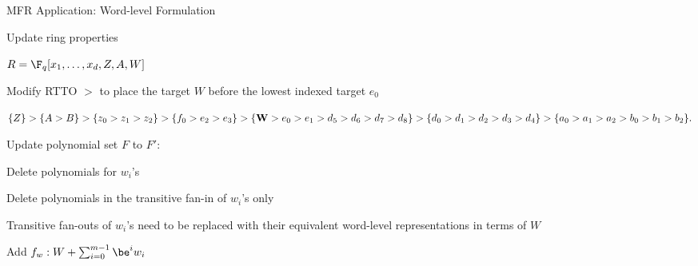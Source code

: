 


\begin{frame}{\large MFR Application: Word-level Formulation}
\bi
	\item Update ring properties 
	\bi
		\item $R=\F_q[x_1,\dots,x_d,Z,A,W]$
		\item Modify RTTO $>$ to place the target $W$ before the lowest indexed target $e_0$
		\bi
			\item $\{Z\}>\{A>B\}>\{z_0>z_1>z_2\}>\{f_0>e_2>e_3\}>\{{\bf{W}}>e_0>e_1>d_5>d_6>d_7>d_8\}>
				\{d_0>d_1>d_2>d_3>d_4\}>\{a_0>a_1>a_2>b_0>b_1>b_2\}.$
		\ei
	\ei
	\vspace{0.1in}
	\item Update polynomial set $F$ to $F'$:
	\bi
		\item Delete polynomials for $w_i$'s
		\item Delete polynomials in the transitive fan-in of $w_i$'s only
		\item Transitive fan-outs of $w_i$'s need to be replaced with their equivalent 
		word-level representations in terms of $W$
		\item Add $f_w: W + \sum_{i=0}^{m-1}\be^iw_i$
	\ei

\ei
\end{frame}



